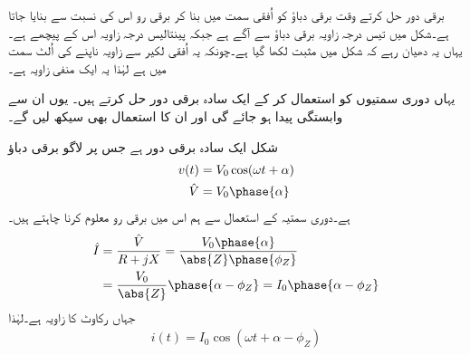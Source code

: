 برقی دور حل کرتے وقت برقی دباؤ  کو اُفقی سمت میں بنا کر برقی رو   اس کی نسبت سے بنایا جاتا ہے۔شکل    میں  تیس درجہ زاویہ برقی دباؤ سے آگے  ہے جبکہ    پینتالیس درجہ زاویہ اس کے پیچھے  ہے۔یہاں یہ دھیان رہے کہ شکل میں   مثبت لکھا گیا ہے۔چونکہ یہ اُفقی لکیر سے زاویہ ناپنے کی اُلٹ سمت میں ہے لہٰذا یہ ایک منفی زاویہ ہے۔

یہاں دوری سمتیوں کو استعمال کر کے ایک سادہ برقی دور حل کرتے ہیں۔ یوں ان سے وابستگی پیدا ہو جائے گی اور ان کا استعمال بھی سیکھ لیں گے۔

شکل    ایک سادہ  برقی دور ہے جس پر لاگو برقی دباؤ
\begin{gather}
\begin{aligned}
v(t)&=V_0 \cos (\omega t +\alpha)\\
\hat{V}&=V_0 \phase{\alpha}
\end{aligned}
\end{gather}
ہے۔دوری سمتیہ کے استعمال سے ہم اس میں برقی رو  معلوم کرنا چاہتے ہیں۔
\begin{gather}
\begin{aligned}
\hat{I}&=\frac{\hat{V}}{R+j X}=\frac{V_0 \phase{\alpha}}{\abs{Z} \phase {\phi_Z}}\\
&=\frac{V_0}{\abs{Z}} \phase{\alpha-\phi_Z}=I_0 \phase{\alpha-\phi_Z}
\end{aligned}
\end{gather}
جہاں  رکاوٹ کا زاویہ  ہے۔لہٰذا
\begin{align}\label{مساوات_بنیادی_حقائق_دوری_سمتیہ_سے_مزاحمت_امالہ_دور_حل}
i(t)=I_0 \cos (\omega t +\alpha-\phi_Z)
\end{align}

